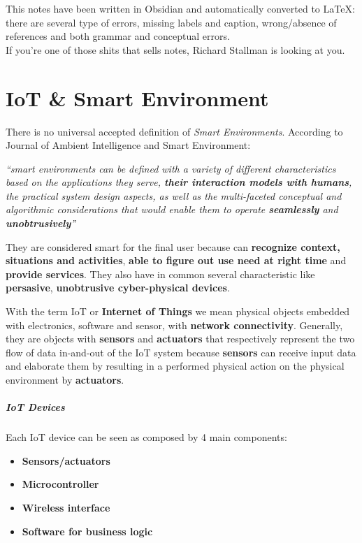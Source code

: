 \documentclass[10pt,a4paper]{report}
\theoremstyle{definition}
\begin{document}
	
	\clearpage
	
	
	\tableofcontents 
	This notes have been written in Obsidian and automatically converted to LaTeX: there are several type of errors, missing labels and caption, wrong/absence of references and both grammar and conceptual errors.\\
	If you're one of those shits that sells notes, Richard Stallman is looking at you.

	
	\clearpage
	
	\chapter{IoT \& Smart Environment}

There is no universal accepted definition of \textit{Smart Environments}. According to Journal of Ambient Intelligence and Smart Environment:
\begin{center}
	\textit{“smart environments can be defined with a variety of different characteristics based on the applications they serve, \textbf{their interaction models with humans}, the practical system design aspects, as well as the multi-faceted conceptual and algorithmic considerations that would enable them to operate \textbf{seamlessly} and \textbf{unobtrusively}”}
\end{center}


They are considered smart for the final user because can \textbf{recognize context, situations and activities}, \textbf{able to figure out use need at right time} and \textbf{provide services}. They also have in common several characteristic like \textbf{persasive}, \textbf{unobtrusive cyber-physical devices}.

With the term IoT or \textbf{Internet of Things} we mean physical objects embedded with electronics, software and sensor, with \textbf{network connectivity}. Generally, they are objects with \textbf{sensors} and \textbf{actuators} that respectively represent the two flow of data in-and-out of the IoT system because \textbf{sensors} can receive input data and elaborate them by resulting in a performed physical action on the physical environment by \textbf{actuators}.
\paragraph{IoT Devices}\label{sec:iot-devices}
Each IoT device can be seen as composed by 4 main components:
\begin{itemize}
	\item 
	\textbf{Sensors/actuators}
	\item 
	\textbf{Microcontroller}
	\item 
	\textbf{Wireless interface}
	\item 
	\textbf{Software for business logic}
	
\end{itemize}
\end{document}
